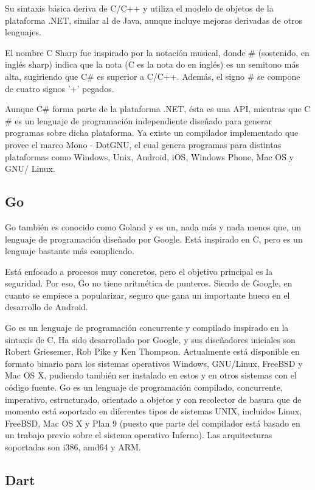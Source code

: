 \documentclass[twoside,twocolumn]{article}
\begin{document}
Su sintaxis básica deriva de C/C++ y utiliza el modelo de objetos de la plataforma .NET, similar al de Java, aunque incluye mejoras derivadas de otros lenguajes.

El nombre C Sharp fue inspirado por la notación musical, donde $\#$ (sostenido, en inglés sharp) indica que la nota (C es la nota do en inglés) es un semitono más alta, sugiriendo que C$\#$ es superior a C/C++. Además, el signo $\#$ se compone de cuatro signos '+' pegados.

Aunque C$\#$ forma parte de la plataforma .NET, ésta es una API, mientras que C$\#$ es un lenguaje de programación independiente diseñado para generar programas sobre dicha plataforma. Ya existe un compilador implementado que provee el marco Mono - DotGNU, el cual genera programas para distintas plataformas como Windows, Unix, Android, iOS, Windows Phone, Mac OS y GNU/
Linux.

\subsection{Go}

Go también es conocido como Goland y es un, nada más y nada menos que, un lenguaje de programación diseñado por Google. Está inspirado en C, pero es un lenguaje bastante más complicado.

Está enfocado a procesos muy concretos, pero el objetivo principal es la seguridad. Por eso, Go no tiene aritmética de punteros. Siendo de Google, en cuanto se empiece a popularizar, seguro que gana un importante hueco en el desarrollo de Android.


Go es un lenguaje de programación concurrente y compilado inspirado en la sintaxis de C. Ha sido desarrollado por Google, y sus diseñadores iniciales son Robert Griesemer, Rob Pike y Ken Thompson. Actualmente está disponible en formato binario para los sistemas operativos Windows, GNU/Linux, FreeBSD y Mac OS X, pudiendo también ser instalado en estos y en otros sistemas con el código fuente. Go es un lenguaje de programación compilado, concurrente, imperativo, estructurado, orientado a objetos y con recolector de basura que de momento está soportado en diferentes tipos de sistemas UNIX, incluidos Linux, FreeBSD, Mac OS X y Plan 9 (puesto que parte del compilador está basado en un trabajo previo sobre el sistema operativo Inferno). Las arquitecturas soportadas son i386, amd64 y ARM.


\subsection{Dart}
\end{document}

